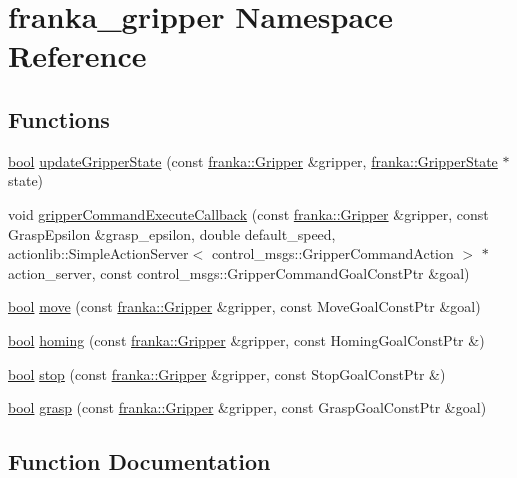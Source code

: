 \hypertarget{namespacefranka__gripper}{}\section{franka\+\_\+gripper Namespace Reference}
\label{namespacefranka__gripper}
\subsection*{Functions}
\begin{DoxyCompactItemize}
\item 
\hyperlink{classbool}{bool} \hyperlink{namespacefranka__gripper_a8d26c346602cc39ab2495f2fffc99d9c}{update\+Gripper\+State} (const \hyperlink{classfranka_1_1Gripper}{franka\+::\+Gripper} \&gripper, \hyperlink{structfranka_1_1GripperState}{franka\+::\+Gripper\+State} $\ast$state)
\item 
void \hyperlink{namespacefranka__gripper_ae9fb03aae11c03a4ad2c5d5c88b80166}{gripper\+Command\+Execute\+Callback} (const \hyperlink{classfranka_1_1Gripper}{franka\+::\+Gripper} \&gripper, const Grasp\+Epsilon \&grasp\+\_\+epsilon, double default\+\_\+speed, actionlib\+::\+Simple\+Action\+Server$<$ control\+\_\+msgs\+::\+Gripper\+Command\+Action $>$ $\ast$action\+\_\+server, const control\+\_\+msgs\+::\+Gripper\+Command\+Goal\+Const\+Ptr \&goal)
\item 
\hyperlink{classbool}{bool} \hyperlink{namespacefranka__gripper_a1356a87108d2229401d3755bd3e53bdf}{move} (const \hyperlink{classfranka_1_1Gripper}{franka\+::\+Gripper} \&gripper, const Move\+Goal\+Const\+Ptr \&goal)
\item 
\hyperlink{classbool}{bool} \hyperlink{namespacefranka__gripper_a098e502a3ba4aed6147ec76f1421e803}{homing} (const \hyperlink{classfranka_1_1Gripper}{franka\+::\+Gripper} \&gripper, const Homing\+Goal\+Const\+Ptr \&)
\item 
\hyperlink{classbool}{bool} \hyperlink{namespacefranka__gripper_a4030b4a443c096b625233396f4314a04}{stop} (const \hyperlink{classfranka_1_1Gripper}{franka\+::\+Gripper} \&gripper, const Stop\+Goal\+Const\+Ptr \&)
\item 
\hyperlink{classbool}{bool} \hyperlink{namespacefranka__gripper_a0233f74b5d7107ae71083e17a024c676}{grasp} (const \hyperlink{classfranka_1_1Gripper}{franka\+::\+Gripper} \&gripper, const Grasp\+Goal\+Const\+Ptr \&goal)
\end{DoxyCompactItemize}


\subsection{Function Documentation}
\mbox{\label{namespacefranka__gripper_a0233f74b5d7107ae71083e17a024c676}} 
